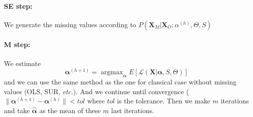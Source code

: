 \documentclass[11pt,a4paper]{report}
\begin{document}
	\paragraph{SE step:}
		We generate the missing values according to $P(\boldsymbol{X}_M|\boldsymbol{X}_O; \alpha^{(h)},\Theta,S)$ 
	\paragraph{M step:}
		We estimate 
		\begin{equation}
	\boldsymbol{\alpha}^{(h+1)}=\operatorname{argmax}_{\boldsymbol{\alpha}}E\left[\mathcal{L}(\boldsymbol{X}|\boldsymbol{\alpha},S,\Theta) \right]
\end{equation}
and we can use the same method as the one for classical case without missing values (OLS, SUR, {\it etc.}).
		And we continue until convergence ($\parallel \boldsymbol{\alpha}^{(h+1)} - \boldsymbol{\alpha}^{(h)}\parallel < tol $ where $tol$ is the tolerance. Then we make $m$ iterations and take $\hat{\boldsymbol{\alpha}}$ as the mean of these $m$ last iterations.
		
\end{document}
